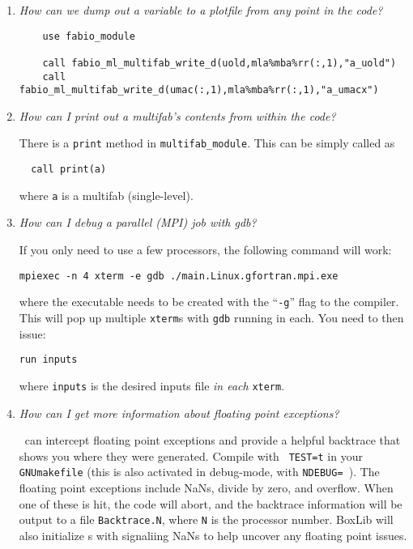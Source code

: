 \begin{enumerate}

\item {\em How can we dump out a variable to a plotfile from any point in the
   code?} 
%
\begin{verbatim}
    use fabio_module

    call fabio_ml_multifab_write_d(uold,mla%mba%rr(:,1),"a_uold")
    call fabio_ml_multifab_write_d(umac(:,1),mla%mba%rr(:,1),"a_umacx")
\end{verbatim}

\item {\em How can I print out a multifab's contents from within the code?}

  There is a {\tt print} method in {\tt multifab\_module}.  This can
  be simply called as
  \begin{verbatim}
  call print(a)
  \end{verbatim}
  where {\tt a} is a multifab (single-level).

\item {\em How can I debug a parallel (MPI) job with gdb?}

If you only need to use a few processors, the following command will work:
\begin{verbatim}
mpiexec -n 4 xterm -e gdb ./main.Linux.gfortran.mpi.exe 
\end{verbatim}
where the executable needs to be created with the ``{\tt -g}'' flag to
the compiler.  This will pop up multiple {\tt xterm}s with {\tt gdb} running
in each.  You need to then issue:
\begin{verbatim}
run inputs
\end{verbatim}
where {\tt inputs} is the desired inputs file {\em in each} {\tt xterm}.



\item {\em How can I get more information about floating point exceptions?}

\boxlib\ can intercept floating point exceptions and provide a helpful
backtrace that shows you where they were generated.  Compile with {\tt
  TEST=t}  in your {\tt GNUmakefile} (this is also
activated in debug-mode, with {\tt NDEBUG= }).  The floating point
exceptions include NaNs, divide by zero, and overflow.  When one of
these is hit, the code will abort, and the backtrace information will
be output to a file {\tt Backtrace.N}, where {\tt N} is the processor
number.  BoxLib will also initialize \multifab s with signaliing NaNs
to help uncover any floating point issues.


\end{enumerate}

